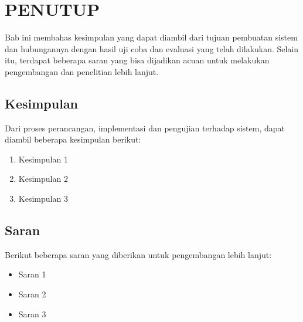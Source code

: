 \chapter{PENUTUP}
  Bab ini membahas kesimpulan yang dapat diambil dari tujuan pembuatan sistem dan hubungannya dengan hasil uji coba dan evaluasi yang telah dilakukan. Selain itu, terdapat beberapa saran yang bisa dijadikan acuan untuk melakukan pengembangan dan penelitian lebih lanjut.
  \section{Kesimpulan}
  Dari proses perancangan, implementasi dan pengujian terhadap sistem, dapat diambil beberapa kesimpulan berikut:
  \begin{enumerate}
    \item Kesimpulan 1
    \item Kesimpulan 2
    \item Kesimpulan 3
  \end{enumerate}
  \section{Saran}
  Berikut beberapa saran yang diberikan untuk pengembangan lebih lanjut:
  \begin{itemize}
    \item Saran 1
    \item Saran 2
    \item Saran 3
  \end{itemize}


